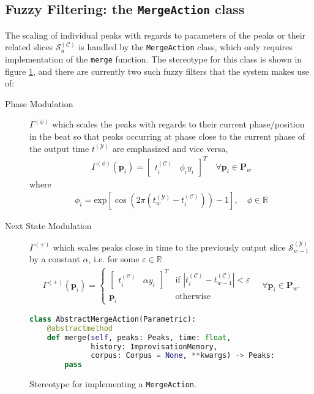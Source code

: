  
 
 \subsection{Fuzzy Filtering: the \texttt{MergeAction} class}\label{sec:4-main-architecture-mergeactions}
 The scaling of individual peaks with regards to parameters of the peaks or their related slices $\mathcal S^{(\mathcal C)}_u$ is handled by the \texttt{MergeAction} class, which only requires implementation of the \texttt{merge} function. The stereotype for this class is shown in figure \ref{fig:4-main-architecture-mergeaction}, and there are currently two such fuzzy filters that the system makes use of: 
\begin{description}
	\item[Phase Modulation] $\Gamma^{(\phi)}$ which scales the peaks with regards to their current phase/position in the beat so that peaks occurring at phase close to the current phase of the output time $t^{(\mathcal Y)}$ are emphasized and vice versa,
	\begin{align}
			\Gamma^{(\phi)}\left(\bm p_i\right) = \begin{bmatrix} t^{(\mathcal C)}_i & \phi_i y_i\end{bmatrix}^T
			\quad \forall \bm p_i \in \bm P_w	
	\end{align}
	 where
	 \begin{align}
 		\phi_i = \text{exp}\left[\cos\left(2\pi \left(t_w^{(\mathcal Y)} - t_i^{(\mathcal C)}\right)\right)-1\right], \quad \phi \in \mathbb R
	 \end{align}
	
	\item[Next State Modulation] $\Gamma^{(+)}$ which scales peaks close in time to the previously output slice $\mathcal S^{(\mathcal Y)}_{w-1}$ by a constant $\alpha$, i.e. for some $\varepsilon \in \mathbb R$
	\begin{align}
		\Gamma^{(+)}(\bm p_i) = \left\lbrace \begin{array}{ll} \begin{bmatrix} t^{(\mathcal C)}_i & \alpha y_i \end{bmatrix}^T & \text{if } \left\lvert t^{(\mathcal{C})}_i - t^{(\mathcal C)}_{w-1} \right\rvert < \varepsilon
		\\[0.24cm]
		\bm p_i & \text{otherwise}
		\end{array}\right. \quad \forall \bm p_i \in \bm P_w.
	\end{align}
\end{description}

 \begin{figure}
 	\begin{lstlisting}[language=Python]
class AbstractMergeAction(Parametric):
   	@abstractmethod
   	def merge(self, peaks: Peaks, time: float, 
     		  history: ImprovisationMemory, 
    		  corpus: Corpus = None, **kwargs) -> Peaks:
  	    pass
 	\end{lstlisting}
 	\caption{Stereotype for implementing a \texttt{MergeAction}.}
 	\label{fig:4-main-architecture-mergeaction}
 \end{figure}

